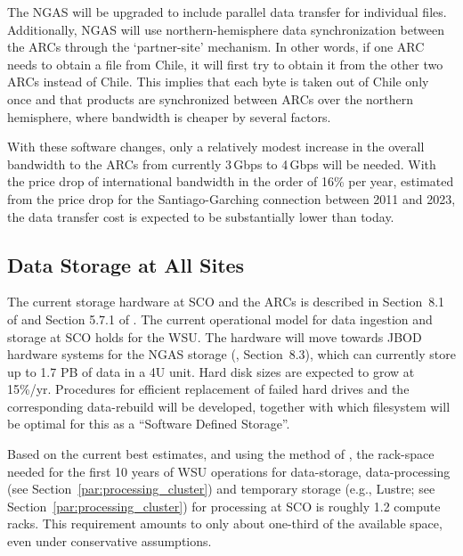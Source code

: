The \ac{NGAS} will be upgraded to include parallel data transfer for individual files. Additionally, \ac{NGAS} will use northern-hemisphere data synchronization between the ARCs through the ‘partner-site’ mechanism. In other words, if one ARC needs to obtain a file from Chile, it will first try to obtain it from the other two ARCs instead of Chile. This implies that each byte is taken out of Chile only once and that products are synchronized between ARCs over the northern hemisphere, where bandwidth is cheaper by several factors.

With these software changes, only a relatively modest increase in the overall bandwidth to the ARCs from currently 3\,Gbps to 4\,Gbps will be needed. With the price drop of international bandwidth in the order of 16\% per year, estimated from the price drop for the Santiago-Garching connection between 2011 and 2023, the data transfer cost is expected to be substantially lower than today.


\subsection{Data Storage at All Sites} \label{dp_hw_storage}

The current storage hardware at SCO and the ARCs is described in Section~8.1 of \cite{dtas} and Section 5.7.1 of \cite{CSA-IA}. The current operational model for data ingestion and storage at SCO holds for the WSU. The hardware will move towards \ac{JBOD} hardware systems for the \ac{NGAS} storage (\cite{dtas}, Section~8.3), which can currently store up to 1.7 PB of data in a 4U unit. Hard disk sizes are expected to grow at 15\%/yr. Procedures for efficient replacement of failed hard drives and the corresponding data-rebuild will be developed, together with which filesystem will be optimal for this as a “Software Defined Storage”. 

Based on the current best estimates, and using the method of \cite{computeCostTsi}, the rack-space needed for the first 10 years of WSU operations for data-storage, data-processing (see Section~\ref{par:processing_cluster}) and temporary storage (e.g., Lustre; see Section~\ref{par:processing_cluster}) for processing at SCO is roughly 1.2 compute racks. 
This requirement amounts to only about one-third of the available space, even under conservative assumptions.

